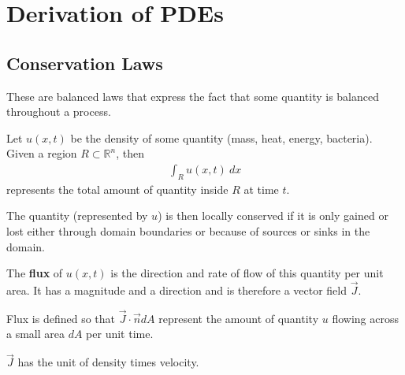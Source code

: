 
\chapter{Derivation of PDEs}

\section{Conservation Laws}
These are balanced laws that express the fact that some quantity is
balanced throughout a process.

Let $u(x, t)$ be the density of some quantity (mass, heat, energy,
bacteria). Given a region $R \subset \mathbb{R}^n$, then
\begin{align*}
  \int_R u(x, t) \ d  x
\end{align*}
represents the total amount of quantity inside $R$ at time $t$.

\begin{definition}
  The quantity (represented by $u$) is then locally conserved if it
  is only gained or lost either through domain boundaries or because
  of sources or sinks in the domain.
\end{definition}

\begin{definition}
  The \textbf{flux} of $u(x, t)$ is the direction and rate of flow of
  this quantity per unit area. It has a magnitude and a direction and
  is therefore a vector field $\vec{J}$.
\end{definition}

\begin{remark}
  Flux is defined so that $\vec{J} \cdot \vec{n}dA$ represent the
  amount of quantity $u$ flowing across a small area $dA$ per unit time.
\end{remark}

\begin{remark}
  $\vec{J}$ has the unit of density times velocity.
\end{remark}

